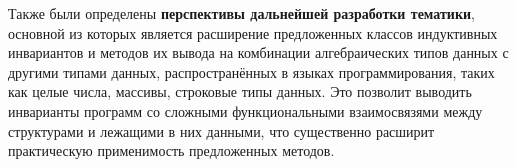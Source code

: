 Также были определены \textbf{перспективы дальнейшей разработки тематики}, основной из которых является расширение предложенных классов индуктивных инвариантов и методов их вывода на комбинации алгебраических типов данных с другими типами данных, распространённых в языках программирования, таких как целые числа, массивы, строковые типы данных. Это позволит выводить инварианты программ со сложными функциональными взаимосвязями между структурами и лежащими в них данными, что существенно расширит практическую применимость предложенных методов.
